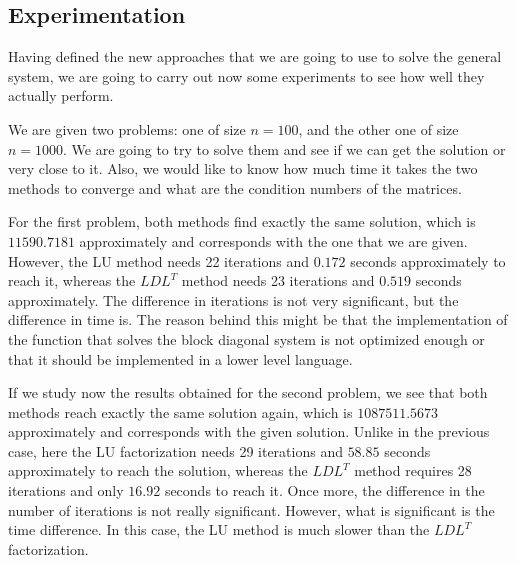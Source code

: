 \documentclass[11pt,a4paper]{article}
\begin{document}
\subsection{Experimentation}

Having defined the new approaches that we are going to use to solve the general system, we are going to
carry out now some experiments to see how well they actually perform.

We are given two problems: one of size $n = 100$, and the other one of size $n = 1000$. We are going to
try to solve them and see if we can get the solution or very close to it. Also, we would like to know
how much time it takes the two methods to converge and what are the condition numbers of the matrices.

For the first problem, both methods find exactly the same solution, which is $11590.7181$ approximately and
corresponds with the one that we are given. However, the LU method needs 22 iterations and $0.172$ seconds
approximately to reach it, whereas the $LDL^T$ method needs 23 iterations and $0.519$ seconds approximately.
The difference in iterations is not very significant, but the difference in time is. The reason behind this might
be that the implementation of the function that solves the block diagonal system is not optimized enough or
that it should be implemented in a lower level language.

If we study now the results obtained for the second problem, we see that both methods reach exactly the same
solution again, which is $1087511.5673$ approximately and corresponds with the given solution.
Unlike in the previous case, here the LU factorization needs 29 iterations and $58.85$ seconds approximately
to reach the solution, whereas the $LDL^T$ method requires 28 iterations and only $16.92$ seconds to reach
it. Once more, the difference in the number of iterations is not really significant. However, what is significant
is the time difference. In this case, the LU method is much slower than the $LDL^T$ factorization.
\end{document}
